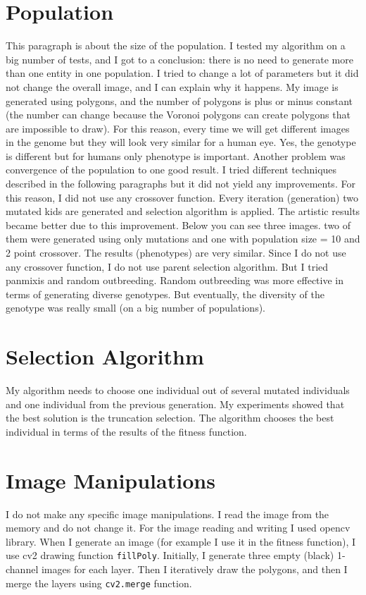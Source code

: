 \documentclass{article}
\begin{document}
\section{Population}
This paragraph is about the size of the population. I tested my algorithm on a big number of tests, and I got to a conclusion: there is no need to generate more than one entity in one population. I tried to change a lot of parameters but it did not change the overall image, and I can explain why it happens. My image is generated using polygons, and the number of polygons is plus or minus constant (the number can change because the Voronoi polygons can create polygons that are impossible to draw). For this reason, every time we will get different images in the genome but they will look very similar for a human eye. Yes, the genotype is different but for humans only phenotype is important.
Another problem was convergence of the population to one good result. I tried different techniques described in the following paragraphs but it did not yield any improvements. For this reason, I did not use any crossover function. Every iteration (generation) two mutated kids are generated and selection algorithm is applied. The artistic results became better due to this improvement. Below you can see three images. two of them were generated using only mutations and one with population size = 10 and 2 point crossover. The results (phenotypes) are very similar. Since I do not use any crossover function, I do not use parent selection algorithm. But I tried panmixis and random outbreeding. Random outbreeding was more effective in terms of generating diverse genotypes. But eventually, the diversity of the genotype was really small (on a big number of populations).
\section{Selection Algorithm}
My algorithm needs to choose one individual out of several mutated individuals and one individual from the previous generation. My experiments showed that the best solution is the truncation selection. The algorithm chooses the best individual in terms of the results of the fitness function. 


\section{Image Manipulations}
I do not make any specific image manipulations. I read the image from the memory and do not change it. For the image reading and writing I used opencv library. When I generate an image (for example I use it in the fitness function), I use cv2 drawing function \texttt{fillPoly}. Initially, I generate three empty (black) 1-channel images for each layer. Then I iteratively draw the polygons, and then I merge the layers using \texttt{cv2.merge} function. 
\end{document}
